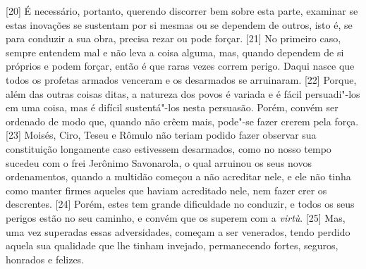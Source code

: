 {[}20{]} É necessário, portanto, querendo discorrer bem sobre esta
parte, examinar se estas inovações se sustentam por si mesmas ou se
dependem de outros, isto é, se para conduzir a sua obra, precisa rezar
ou pode forçar. {[}21{]} No primeiro caso, sempre entendem mal e não
leva a coisa alguma, mas, quando dependem de si próprios e podem forçar,
então é que raras vezes correm perigo. Daqui nasce que todos os profetas
armados venceram e os desarmados se arruinaram. {[}22{]} Porque, além
das outras coisas ditas, a natureza dos povos é variada e é fácil
persuadi"-los em uma coisa, mas é difícil sustentá"-los nesta persuasão.
Porém, convém ser ordenado de modo que, quando não crêem mais, pode"-se
fazer crerem pela força. {[}23{]} Moisés, Ciro, Teseu e Rômulo não
teriam podido fazer observar sua constituição longamente caso estivessem
desarmados, como no nosso tempo sucedeu com o frei Jerônimo
Savonarola, o qual arruinou os seus novos ordenamentos, quando a multidão
começou a não acreditar nele, e ele não tinha como manter firmes aqueles
que haviam acreditado nele, nem fazer crer os descrentes. {[}24{]}
Porém, estes tem grande dificuldade no conduzir, e todos os seus perigos
estão no seu caminho, e convém que os superem com a \emph{virtù}.
{[}25{]} Mas, uma vez superadas essas adversidades, começam a ser
venerados, tendo perdido aquela sua qualidade que lhe tinham invejado,
permanecendo fortes, seguros, honrados e felizes.

